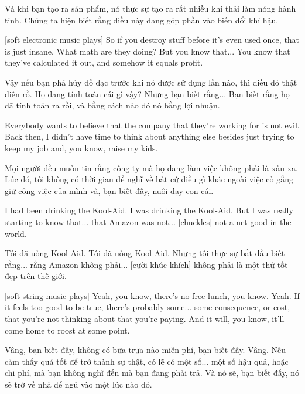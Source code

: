 \documentclass[a4paper]{article}
\begin{document}
	\begin{vietnamese-v2}
		[Maren] Và khi bạn tạo ra sản phẩm, nó thực sự tạo ra rất nhiều khí thải làm nóng hành tinh. Chúng ta hiện biết rằng điều này đang góp phần vào biến đổi khí hậu.
	\end{vietnamese-v2}
	
	[soft electronic music plays]
	So if you destroy stuff before it's even used once, that is just insane.
	What math are they doing?
	But you know that... You know that they've calculated it out, and somehow it equals profit.
	
	\begin{vietnamese-v2}
		Vậy nếu bạn phá hủy đồ đạc trước khi nó được sử dụng lần nào, thì điều đó thật điên rồ.
		Họ đang tính toán cái gì vậy?
		Nhưng bạn biết rằng... Bạn biết rằng họ đã tính toán ra rồi, và bằng cách nào đó nó bằng lợi nhuận.
	\end{vietnamese-v2}
	
	Everybody wants to believe that the company that they're working for is not evil.
	Back then, I didn't have time to think about anything else besides just trying to keep my job and, you know, raise my kids.
	
	\begin{vietnamese-v2}
		Mọi người đều muốn tin rằng công ty mà họ đang làm việc không phải là xấu xa.
		Lúc đó, tôi không có thời gian để nghĩ về bất cứ điều gì khác ngoài việc cố gắng giữ công việc của mình và, bạn biết đấy, nuôi dạy con cái.
	\end{vietnamese-v2}
	
	I had been drinking the Kool-Aid. I was drinking the Kool-Aid.
	But I was really starting to know that... that Amazon was not... [chuckles] not a net good in the world.
	
	\begin{vietnamese-v2}
		Tôi đã uống Kool-Aid. Tôi đã uống Kool-Aid.
		Nhưng tôi thực sự bắt đầu biết rằng... rằng Amazon không phải... [cười khúc khích] không phải là một thứ tốt đẹp trên thế giới.
	\end{vietnamese-v2}
	
	[soft string music plays]
	Yeah, you know, there's no free lunch, you know. Yeah.
	If it feels too good to be true, there's probably some... some consequence, or cost, that you're not thinking about that you're paying. And it will, you know, it'll come home to roost at some point.
	
	\begin{vietnamese-v2}
		Vâng, bạn biết đấy, không có bữa trưa nào miễn phí, bạn biết đấy. Vâng.
		Nếu cảm thấy quá tốt để trở thành sự thật, có lẽ có một số... một số hậu quả, hoặc chi phí, mà bạn không nghĩ đến mà bạn đang phải trả. Và nó sẽ, bạn biết đấy, nó sẽ trở về nhà để ngủ vào một lúc nào đó.
	\end{vietnamese-v2}
	
\end{document}

